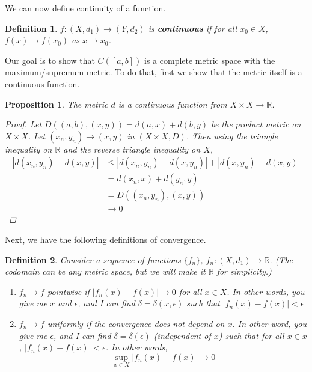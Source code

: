 \documentclass[10pt]{article}         %
\newtheorem{definition}{Definition}[section]
\newtheorem{proposition}{Proposition}[section]
\theoremstyle{remark}
\newcommand{\R}{\mathbb{R}}
\begin{document}
We can now define continuity of a function.

\begin{definition}
$f : (X, d_1) \rightarrow (Y, d_2)$ is \textbf{continuous} if for all $x_0 \in X$, $f(x) \rightarrow f(x_0)$ as $x \rightarrow x_0$.
\end{definition}

Our goal is to show that $C([a,b])$ is a complete metric space with the maximum/supremum metric. To do that, first we show that the metric itself is a continuous function.

\begin{proposition}
The metric $d$ is a continuous function from $X \times X \rightarrow \R$.
\begin{proof}
Let $D((a,b),(x,y)) = d(a,x)+d(b,y)$ be the product metric on $X \times X$. Let $(x_n, y_n) \rightarrow (x, y)$ in $(X \times X, D)$. Then using the triangle inequality on $\R$ and the reverse triangle inequality on $X$,
\begin{align*}
    |d(x_n, y_n) - d(x,y)| &\leq |d(x_n, y_n) - d(x, y_n)| + |d(x, y_n) - d(x,y)| \\
    &= d(x_n, x) + d(y_n, y) \\
    &= D((x_n, y_n), (x, y)) \\
    &\rightarrow 0
\end{align*}
\end{proof}
\end{proposition}

Next, we have the following definitions of convergence.

\begin{definition}
Consider a sequence of functions $\{f_n\}$, $f_n:(X, d_1) \rightarrow \R$. (The codomain can be any metric space, but we will make it $\R$ for simplicity.)
\begin{enumerate}
    \item $f_n \rightarrow f$ \emph{pointwise} if $|f_n(x) - f(x)| \rightarrow 0$ for all $x \in X$. In other words, you give me $x$ and $\epsilon$, and I can find $\delta = \delta(x, \epsilon)$ such that $|f_n(x) - f(x)| < \epsilon$
    \item $f_n \rightarrow f$ \emph{uniformly} if the convergence does not depend on $x$. In other word, you give me $\epsilon$, and I can find $\delta = \delta(\epsilon)$ (independent of $x$) such that for all $x \in x$, $|f_n(x) - f(x)| < \epsilon$. In other words,
    \[
    \sup_{x \in X}|f_n(x) - f(x)| \rightarrow 0
    \]
\end{enumerate}
\end{definition}
\end{document}
